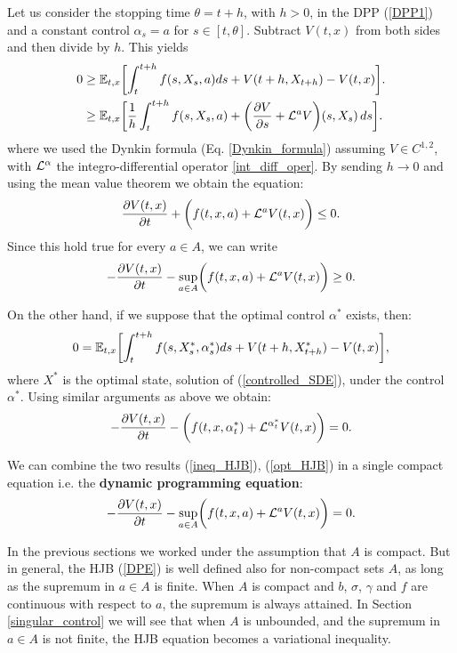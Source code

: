 \noindent
Let us consider the stopping time $\theta = t + h$, with $h>0$, in the DPP (\ref{DPP1}) and a constant control $\alpha_s = a$ for $s \in [t,\theta]$. 
Subtract $V(t,x)$ from both sides and then divide by $h$. This yields
\begin{align*}
   0 \geq& \; \mathbb{E}_{t,x} \biggl[ \int_t^{t+h} f(s,X_s,a) ds + V(t+h, X_{t+h}) - V(t,x) \biggr]. \\ 
     \geq& \; \mathbb{E}_{t,x} \biggl[ \frac{1}{h} \int_t^{t+h} f(s,X_s,a) 
     + \biggl( \frac{\partial V}{\partial s} + \mathcal{L}^{a}V \biggr)(s, X_{s}) \, ds \biggr]. \\
\end{align*}
where we used the Dynkin formula (Eq. \ref{Dynkin_formula}) assuming $V \in C^{1,2}$, with $\mathcal{L}^{\alpha}$ the integro-differential operator \ref{int_diff_oper}.
By sending $h \to 0$ and using the mean value theorem we obtain the equation:
\begin{equation}
 \frac{\partial V(t,x)}{\partial t} + \biggl( f(t,x,a) + \mathcal{L}^{a}V(t,x)  \biggr) \leq 0.
\end{equation}
Since this hold true for every $a \in A$, we can write
\begin{equation}\label{ineq_HJB}
 -\frac{\partial V(t,x)}{\partial t} - \sup_{a \in A} \biggl( f(t,x,a) + \mathcal{L}^{a}V(t,x)  \biggr) \geq 0.
\end{equation}

On the other hand, if we suppose that the optimal control $\alpha^*$ exists, then:
\begin{equation}
 0 = \mathbb{E}_{t,x} \biggl[ \int_t^{t+h} f(s,X^*_s,\alpha^*_s) ds + V(t+h, X^*_{t+h}) - V(t,x) \biggr],
\end{equation}
where $X^*$ is the optimal state, solution of (\ref{controlled_SDE}), under the control $\alpha^*$.
Using similar arguments as above we obtain:
\begin{equation}\label{opt_HJB}
 -\frac{\partial V(t,x)}{\partial t} - \biggl( f(t,x,\alpha_t^*) + \mathcal{L}^{\alpha_t^*} V(t,x)  \biggr) = 0.
\end{equation}

We can combine the two results (\ref{ineq_HJB}), (\ref{opt_HJB}) in a single compact equation i.e. the \textbf{dynamic programming equation}:
\begin{equation}\label{DPE}
 -\frac{\partial V(t,x)}{\partial t} - \sup_{a \in A} \biggl( f(t,x,a) + \mathcal{L}^{a}V(t,x)  \biggr) = 0.
\end{equation}

\begin{Remark}
In the previous sections we worked under the assumption that $A$ is compact. 
But in general, the HJB (\ref{DPE}) is well defined also for non-compact sets $A$, as long as the supremum in $a\in A$ is finite.
When $A$ is compact and $b$, $\sigma$, $\gamma$ and $f$ are continuous with respect to $a$, the supremum is always attained. 
In Section \ref{singular_control} we will see that when $A$ is unbounded, and the supremum in $a\in A$ is not finite, the HJB equation becomes a variational inequality.
\end{Remark}

